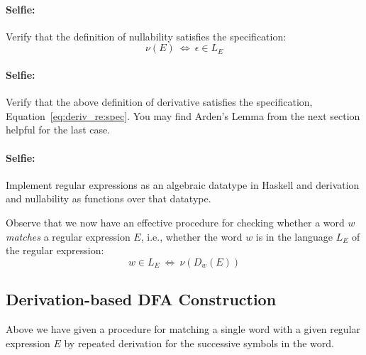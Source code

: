 \paragraph{Selfie:} 
Verify that the definition of nullability satisfies the specification:
\begin{equation*}
	\nu(E) ~\Leftrightarrow~ \epsilon \in L_E
\end{equation*}

\paragraph{Selfie:} 
Verify that the above definition of derivative satisfies the specification, Equation~\ref{eq:deriv_re:spec}. 
You may find Arden's Lemma from the next section helpful for the last case.

\paragraph{Selfie:} 
Implement regular expressions as an algebraic datatype in Haskell and 
derivation and nullability as functions over that datatype.


Observe that we now have an effective procedure for checking whether a word $w$
\emph{matches} a regular expression $E$, i.e., whether the word $w$ is in the language
$L_E$ of the regular expression:
\begin{equation*}
	w \in L_E ~\Leftrightarrow~ \nu(D_w(E))
\end{equation*}

\subsection{Derivation-based DFA Construction}

Above we have given a procedure for matching a single word with a given regular
expression $E$ by repeated derivation for the successive symbols in the word. 

